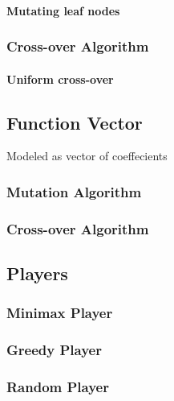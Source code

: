 \documentclass{acm_proc_article-sp}
\begin{document}
            \paragraph{Mutating leaf nodes}
        
        \subsubsection{Cross-over Algorithm}
        
            \paragraph{Uniform cross-over}


    \subsection{Function Vector}
        
        Modeled as vector of coeffecients
    
        \subsubsection{Mutation Algorithm}
        
        \subsubsection{Cross-over Algorithm}

    \subsection{Players}

        \subsubsection{Minimax Player}
    
        \subsubsection{Greedy Player}
    
        \subsubsection{Random Player}
\end{document}
